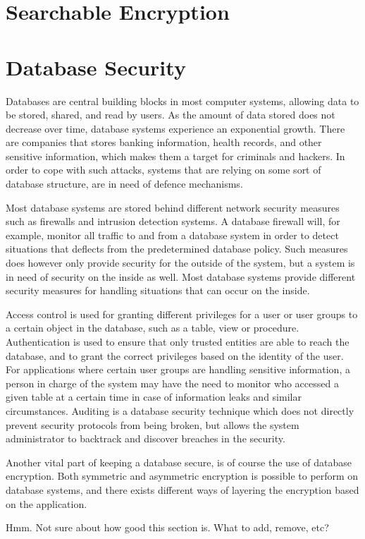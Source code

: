 \section{Searchable Encryption}

\section{Database Security}
\label{chp:database_Security}

Databases are central building blocks in most computer systems, allowing data to be stored, shared, and read by users. As the amount of data stored does not decrease over time, database systems experience an exponential growth. There are companies that stores banking information, health records, and other sensitive information, which makes them a target for criminals and hackers. In order to cope with such attacks, systems that are relying on some sort of database structure, are in need of defence mechanisms. 


Most database systems are stored behind different network security measures such as firewalls and intrusion detection systems. A database firewall will, for example, monitor all traffic to and from a database system in order to detect situations that deflects from the predetermined database policy. Such measures does however only provide security for the outside of the system, but a system is in need of security on the inside as well. Most database systems provide different security measures for handling situations that can occur on the inside.

Access control is used for granting different privileges for a user or user groups to a certain object in the database, such as a table, view or procedure. Authentication is used to ensure that only trusted entities are able to reach the database, and to grant the correct privileges based on the identity of the user. For applications where certain user groups are handling sensitive information, a person in charge of the system may have the need to monitor who accessed a given table at a certain time in case of information leaks and similar circumstances. Auditing is a database security technique which does not directly prevent security protocols from being broken, but allows the system administrator to backtrack and discover breaches in the security.

Another vital part of keeping a database secure, is of course the use of database encryption. Both symmetric and asymmetric encryption is possible to perform on database systems, and there exists different ways of layering the encryption based on the application.


Hmm. Not sure about how good this section is. What to add, remove, etc?
